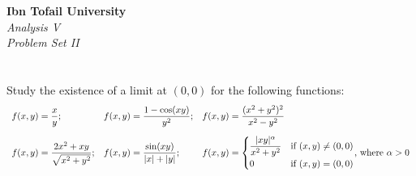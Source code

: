 \documentclass[12pt]{article}
\begin{document}
\begin{center}
\Large\textbf{Ibn Tofail University} \\[1em]
\large\textit{Analysis V} \\[2em]
\large\textit{Problem Set II} \\[0.5em]
\end{center}

\vspace{1cm}
\section{}
Study the existence of a limit at $(0, 0)$ for the following functions:
\[
\begin{array}{lll}
\displaystyle f(x, y) = \dfrac{x}{y}; &
\displaystyle f(x, y) = \dfrac{1 - \cos(xy)}{y^2}; &
\displaystyle f(x, y) = \dfrac{(x^2 + y^2)^2}{x^2 - y^2} \\[1.5em]
\displaystyle f(x, y) = \dfrac{2x^2 + xy}{\sqrt{x^2 + y^2}}; &
\displaystyle f(x, y) = \dfrac{\sin(xy)}{|x| + |y|}; &
\displaystyle f(x, y) = \begin{cases} 
                        \dfrac{|xy|^\alpha}{x^2 + y^2} & \text{if } (x, y) \neq (0, 0) \\[0.5em]
                        0 & \text{if } (x, y) = (0, 0)
                        \end{cases}$, where $\alpha > 0
\end{array}
\]
\end{document}
